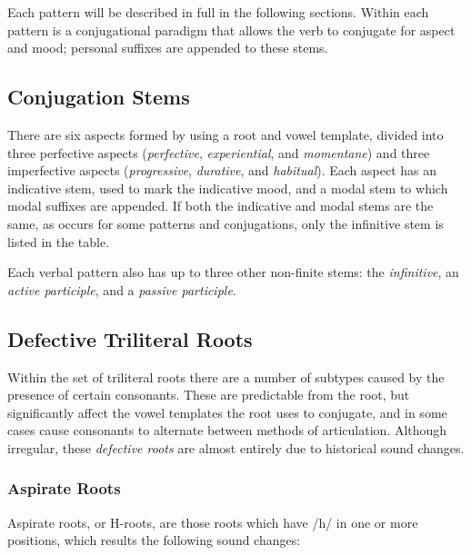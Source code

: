 \documentclass[grammar]{subfiles}
\begin{document}

Each pattern will be described in full in the following sections.  Within each
pattern is a conjugational paradigm that allows the verb to conjugate for
aspect and mood; personal suffixes are appended to these stems.


\subsection{Conjugation Stems}
\label{sssec:vm_conjugation}

There are six aspects formed by using a root and vowel template, divided into
three perfective aspects (\emph{perfective}, \emph{experiential}, and
\emph{momentane}) and three imperfective aspects (\emph{progressive},
\emph{durative}, and \emph{habitual}).  Each aspect has an indicative stem,
used to mark the indicative mood, and a modal stem to which modal suffixes are
appended.  If both the indicative and modal stems are the same, as occurs for
some patterns and conjugations, only the infinitive stem is listed in the
table. 

Each verbal pattern also has up to three other non-finite stems: the
\emph{infinitive}, an \emph{active participle}, and a \emph{passive participle}.  


\subsection{Defective Triliteral Roots}
\label{ssec:vm_defective_roots}

Within the set of triliteral roots there are a number of subtypes caused by
the presence of certain consonants.  These are predictable from the root, but
significantly affect the vowel templates the root uses to conjugate, and in
some cases cause consonants to alternate between methods of articulation.
Although irregular, these \emph{defective roots} are almost entirely due to
historical sound changes. 


\subsubsection{Aspirate Roots}
\label{sssec:vm_aspirate_roots}

Aspirate roots, or H-roots, are those roots which have /h/ in one or more positions, which
results the following sound changes:
\end{document}
